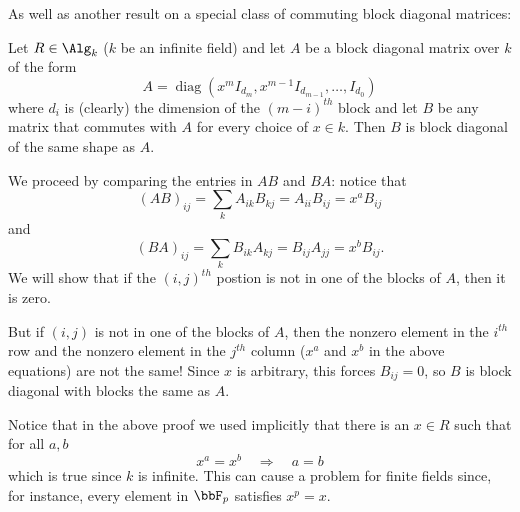 \documentclass[12pt]{article}
\begin{document}
As well as another result on a special class of commuting block diagonal matrices:
\begin{lem}\label{lem:block-diag}
	Let $R\in\Alg_k$ ($k$ be an infinite field) and let $A$ be a block diagonal matrix over $k$ of the form
	\[A=\operatorname{diag}(x^mI_{d_m},x^{m-1}I_{d_{m-1}},\dots,I_{d_0})\]
	where $d_i$ is (clearly) the dimension of the $(m-i)^{th}$ block and let $B$ be any matrix that commutes with $A$
	for every choice of $x\in k$. Then $B$ is block diagonal of the same shape as $A$. 
\end{lem}
\begin{prf}
	We proceed by comparing the entries in $AB$ and $BA$: notice that 
	\[(AB)_{ij}=\sum_k A_{ik}B_{kj}=A_{ii}B_{ij}=x^aB_{ij}\]
	and 
	\[(BA)_{ij}=\sum_k B_{ik}A_{kj}=B_{ij}A_{jj}=x^bB_{ij}.\]
	We will show that if the $(i,j)^{th}$ postion is not in one of the blocks of $A$, then it is zero.

	But if $(i,j)$ is not in one of the blocks of $A$, then the nonzero element in the $i^{th}$ row and the nonzero element in 
	the $j^{th}$ column ($x^a$ and $x^b$ in the above equations) are not the same! Since $x$ is arbitrary, this forces $B_{ij}=0$,
	so $B$ is block diagonal with blocks the same as $A$.
\end{prf}
\begin{rmk}
	Notice that in the above proof we used implicitly that there is an $x\in R$ such that for all $a,b$
	\[x^a=x^b\quad\Rightarrow\quad a=b\]
	which is true since $k$ is infinite. This can cause a problem for finite fields since, for instance, every element in $\bbF_p$ satisfies $x^p=x$.
\end{rmk}
\end{document}

